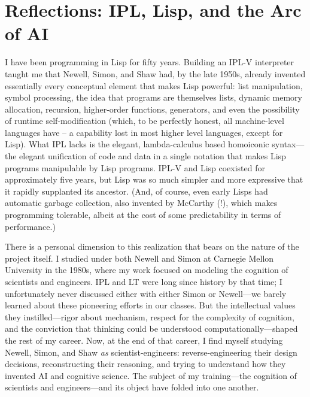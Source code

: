 \documentclass[journal]{IEEEtran}
\begin{document}
\section{Reflections: IPL, Lisp, and the Arc of AI}
\label{sec:reflections}

I have been programming in Lisp for fifty years. Building an IPL-V
interpreter taught me that Newell, Simon, and Shaw had, by the late
1950s, already invented essentially every conceptual element that
makes Lisp powerful: list manipulation, symbol processing, the idea
that programs are themselves lists, dynamic memory allocation,
recursion, higher-order functions, generators, and even the
possibility of runtime self-modification (which, to be perfectly
honest, all machine-level languages have -- a capability lost in most
higher level languages, except for Lisp). What IPL lacks is the
elegant, lambda-calculus based homoiconic syntax---the elegant
unification of code and data in a single notation that makes Lisp
programs manipulable by Lisp programs.  IPL-V and Lisp coexisted for
approximately five years, but Lisp was so much simpler and more
expressive that it rapidly supplanted its ancestor. (And, of course,
even early Lisps had automatic garbage collection, also invented by
McCarthy (!), which makes programming tolerable, albeit at the cost
of some predictability in terms of performance.)

There is a personal dimension to this realization that bears on the
nature of the project itself. I studied under both Newell and Simon at
Carnegie Mellon University in the 1980s, where my work focused on
modeling the cognition of scientists and engineers. IPL and LT were
long since history by that time; I unfortunately never discussed
either with either Simon or Newell---we barely learned about these
pioneering efforts in our classes. But the intellectual values they
instilled---rigor about mechanism, respect for the complexity of
cognition, and the conviction that thinking could be understood
computationally---shaped the rest of my career. Now, at the end of
that career, I find myself studying Newell, Simon, and Shaw
\textit{as} scientist-engineers: reverse-engineering their design
decisions, reconstructing their reasoning, and trying to understand
how they invented AI and cognitive science. The subject of my
training---the cognition of scientists and engineers---and its object
have folded into one another.
\end{document}
